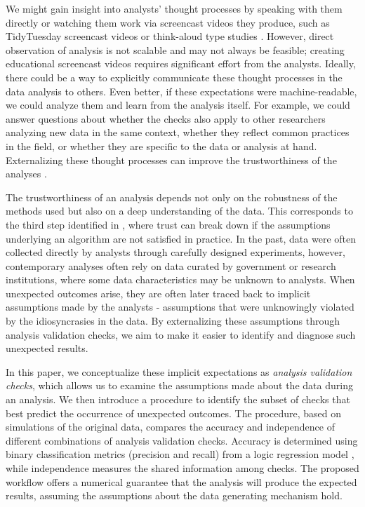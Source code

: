\documentclass[
  12pt,
]{interact}
\begin{document}
We might gain insight into analysts' thought processes by speaking with
them directly or watching them work via screencast videos they produce,
such as TidyTuesday screencast videos or think-aloud type studies
\citep[e.g.][]{gu2024data}. However, direct observation of analysis is
not scalable and may not always be feasible; creating educational
screencast videos requires significant effort from the analysts.
Ideally, there could be a way to explicitly communicate these thought
processes in the data analysis to others. Even better, if these
expectations were machine-readable, we could analyze them and learn from
the analysis itself. For example, we could answer questions about
whether the checks also apply to other researchers analyzing new data in
the same context, whether they reflect common practices in the field, or
whether they are specific to the data or analysis at hand. Externalizing
these thought processes can improve the trustworthiness of the analyses
\citep{yu2024veridical}.

The trustworthiness of an analysis depends not only on the robustness of
the methods used but also on a deep understanding of the data. This
corresponds to the third step identified in
\citet{broderick_toward_2023}, where trust can break down if the
assumptions underlying an algorithm are not satisfied in practice. In
the past, data were often collected directly by analysts through
carefully designed experiments, however, contemporary analyses often
rely on data curated by government or research institutions, where some
data characteristics may be unknown to analysts. When unexpected
outcomes arise, they are often later traced back to implicit assumptions
made by the analysts - assumptions that were unknowingly violated by the
idiosyncrasies in the data. By externalizing these assumptions through
analysis validation checks, we aim to make it easier to identify and
diagnose such unexpected results.

In this paper, we conceptualize these implicit expectations as
\emph{analysis validation checks}, which allows us to examine the
assumptions made about the data during an analysis. We then introduce a
procedure to identify the subset of checks that best predict the
occurrence of unexpected outcomes. The procedure, based on simulations
of the original data, compares the accuracy and independence of
different combinations of analysis validation checks. Accuracy is
determined using binary classification metrics (precision and recall)
from a logic regression model \citep{ruczinski_logic_2003}, while
independence measures the shared information among checks. The proposed
workflow offers a numerical guarantee that the analysis will produce the
expected results, assuming the assumptions about the data generating
mechanism hold.
\end{document}
